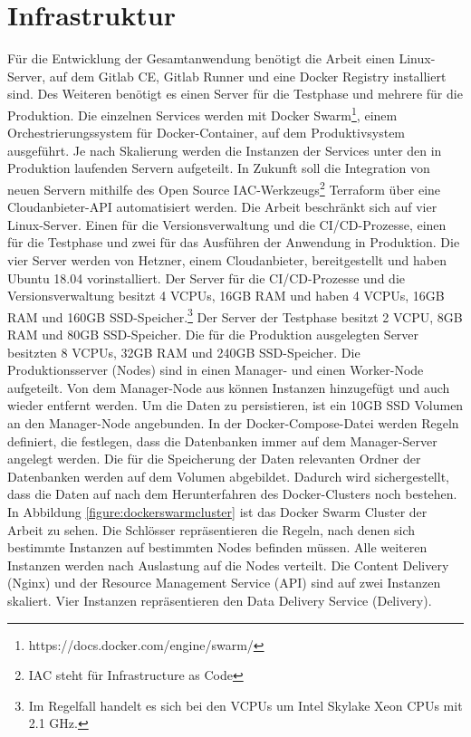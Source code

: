 \section{Infrastruktur}
\label{sec:infrastruktur}
Für die Entwicklung der Gesamtanwendung benötigt die Arbeit einen Linux-Server,
auf dem Gitlab CE, Gitlab Runner und eine Docker Registry
installiert sind. Des Weiteren benötigt es einen Server für die Testphase und mehrere für die
Produktion. Die einzelnen Services werden mit Docker Swarm\footnote{https://docs.docker.com/engine/swarm/},
einem Orchestrierungssystem für Docker-Container, auf dem Produktivsystem ausgeführt. Je nach Skalierung
werden die Instanzen der Services unter den in Produktion laufenden Servern aufgeteilt.
In Zukunft soll die Integration von neuen Servern mithilfe des Open Source IAC-Werkzeugs\footnote{IAC steht für Infrastructure as Code}
Terraform über eine Cloudanbieter-API automatisiert werden.
Die Arbeit beschränkt sich auf vier Linux-Server. Einen für die Versionsverwaltung
und die CI/CD-Prozesse, einen für die Testphase und zwei für das Ausführen der Anwendung in Produktion.
Die vier Server werden von Hetzner, einem Cloudanbieter, bereitgestellt und haben Ubuntu 18.04
vorinstalliert. Der Server für die CI/CD-Prozesse und die Versionsverwaltung besitzt 4 VCPUs, 
16GB RAM und  haben 4 VCPUs, 16GB RAM und 160GB SSD-Speicher.\footnote{Im Regelfall handelt es sich bei
den VCPUs um Intel Skylake Xeon CPUs mit 2.1 GHz.\cite{CPUusedInHetznerCLoud}}
Der Server der Testphase besitzt 2 VCPU, 8GB RAM und 80GB SSD-Speicher. Die für die Produktion
ausgelegten Server besitzten 8 VCPUs, 32GB RAM und 240GB SSD-Speicher.
Die Produktionsserver (Nodes) sind in einen Manager- und einen Worker-Node aufgeteilt. Von dem Manager-Node
aus können Instanzen hinzugefügt und auch wieder entfernt werden. Um die Daten zu persistieren,
ist ein 10GB SSD Volumen an den Manager-Node angebunden. In der Docker-Compose-Datei werden
Regeln definiert, die festlegen, dass die Datenbanken immer auf dem Manager-Server angelegt werden.
Die für die Speicherung der Daten relevanten Ordner der Datenbanken werden auf dem Volumen abgebildet.
Dadurch wird sichergestellt, dass die Daten auf nach dem Herunterfahren des Docker-Clusters noch bestehen.
In Abbildung \ref{figure:dockerswarmcluster} ist das Docker Swarm Cluster der Arbeit zu sehen. Die Schlösser
repräsentieren die Regeln, nach denen sich bestimmte Instanzen auf bestimmten Nodes befinden müssen.
Alle weiteren Instanzen werden nach Auslastung auf die Nodes verteilt. Die Content Delivery (Nginx)
und der Resource Management Service (API) sind auf zwei Instanzen skaliert. Vier Instanzen repräsentieren
den Data Delivery Service (Delivery).


